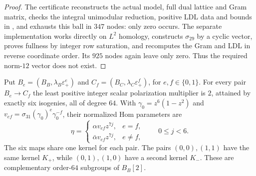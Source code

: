 \begin{proof}
The certificate 
reconstructs the actual model, full dual lattice and Gram matrix,
checks the integral unimodular reduction, positive LDL data and
bounds in ,
and exhausts this ball in $347$ nodes: only zero occurs.
The separate implementation
 works directly
on $L^2$ homology, constructs $\sigma_{29}$ by a cyclic vector,
proves fullness by integer row saturation, and recomputes the
Gram and LDL in reverse coordinate order. Its $925$ nodes again
leave only zero. Thus the required norm-$12$ vector does not exist.
\end{proof}

\begin{proposition}
\label{pp:prop:polarizationsquare}
Put $B_e=(B_B,\lambda_B\varepsilon_+^e)$ and
$C_f=(B_C,\lambda_C\varepsilon_+^f)$, for $e,f\in\{0,1\}$.
For every pair $B_e\to C_f$ the least positive integer scalar
polarization multiplier is $2$, attained by exactly six isogenies,
all of degree $64$.
With $\gamma_0=z^6(1-z^2)$ and
$v_{ef}=\sigma_{31}(\gamma_0)^e\gamma_0^{-f}$,
their normalized Hom parameters are
\[
 \eta=\begin{cases}
 \alpha v_{ef}z^{7j},&e=f,\\
 \bar\alpha v_{ef}z^{7j},&e\ne f,
 \end{cases}\qquad 0\le j<6.
\]
The six maps share one kernel for each pair. The pairs $(0,0),(1,1)$
have the same kernel $K_+$, while $(0,1),(1,0)$ have a second kernel
$K_-$. These are complementary order-$64$ subgroups of $B_B[2]$.
\end{proposition}
